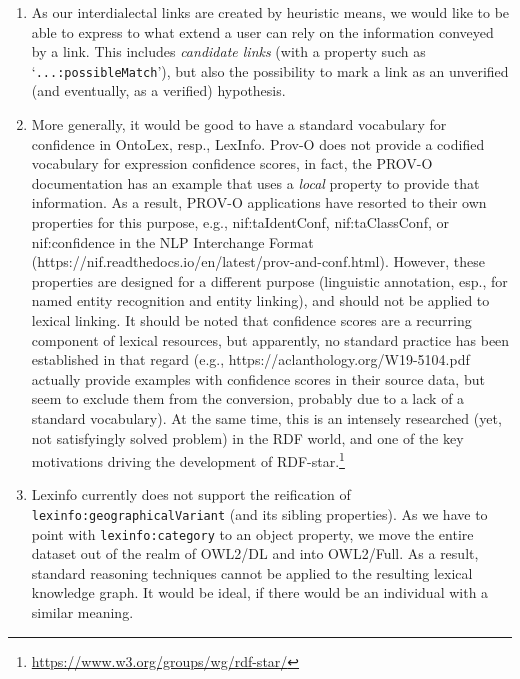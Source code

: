 \documentclass[11pt]{article}
\newcommand{\onto}[1]{\texttt{#1}} %
\begin{document}
\begin{enumerate}
\begin{enumerate}
\item As our interdialectal links are created by heuristic means, we would like to be able to express to what extend a user can rely on the information conveyed by a link. This includes \emph{candidate links} (with a property such as `\onto{...:possibleMatch}'), but also the possibility to mark a link as an unverified (and eventually, as a verified) hypothesis.
\item More generally, it would be good to have a standard vocabulary for confidence in OntoLex, resp., LexInfo. Prov-O does not provide a codified vocabulary for expression confidence scores, in fact, the PROV-O documentation has an example that uses a \emph{local} property to provide that information. As a result, PROV-O applications have resorted to their own properties for this purpose, e.g., nif:taIdentConf, nif:taClassConf, or nif:confidence in the NLP Interchange Format (https://nif.readthedocs.io/en/latest/prov-and-conf.html). However, these properties are designed for a different purpose (linguistic annotation, esp., for named entity recognition and entity linking), and should not be applied to lexical linking. It should be noted that confidence scores are a recurring component of lexical resources, but apparently, no standard practice has been established in that regard (e.g., https://aclanthology.org/W19-5104.pdf actually provide examples with confidence scores in their source data, but seem to exclude them from the conversion, probably due to a lack of a standard vocabulary). At the same time, this is an intensely researched (yet, not satisfyingly solved problem) in the RDF world, and one of the key motivations driving the development of RDF-star.\footnote{\url{https://www.w3.org/groups/wg/rdf-star/}}
\item Lexinfo currently does not support the reification of \onto{lexinfo:geographicalVariant} (and its sibling properties). As we have to point with \onto{lexinfo:category} to an object property, we move the entire dataset out of the realm of OWL2/DL and into OWL2/Full. As a result, standard reasoning techniques cannot be applied to the resulting lexical knowledge graph. It would be ideal, if there would be an individual with a similar meaning.
\end{enumerate}


\end{enumerate}
\end{document}
